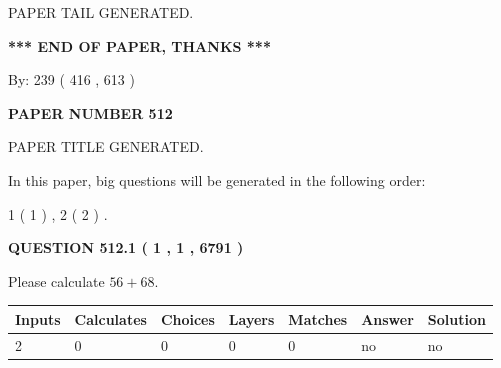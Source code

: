 \documentclass[12pt]{article}
\begin{document}
   
   
\vspace{2.0in} PAPER TAIL GENERATED.
   
   
   
   
\vspace{1.0in} 
{\textbf{\large{ *** END OF PAPER, THANKS *** }}} 
   
   
\hspace{1.0in} By: 
 239 ( 416 ,  613 )
   
   
   
   
\newpage 
\setcounter{page}{ 
   512001 } 
   
   
   
   
 {\textbf{ \Large{ PAPER NUMBER  512  }}}
   
   
\vspace{0.2in}
   
   
   
   
   
   
   
   
 \vspace{0.2in}
 
 
 
 
   
   
 PAPER TITLE GENERATED.
   
   
   
\vspace{0.2in}
   
In this paper, big questions will be generated in the following order: 
   
   
   1 ( 1 )
 ,
   2 ( 2 )
 .
  
\vspace{0.2in}
  
{\textbf{\Large{QUESTION
512.1 
 ( 1 , 1 , 6791 )
}}}
  
  
 
Please calculate $ %
56 +  %
68 $.
 
 
   
   
   
   
\noindent\begin{tabular}{|l|l|l|l|l|l|l|}
 \hline
Inputs & Calculates & Choices & Layers & Matches & Answer & Solution \\ \hline
 2  & 
 0  & 
 0
  & 
 0  & 
 0  & 
  no & 
  no 
  \\ \hline
 \end{tabular}
   
\end{document}
